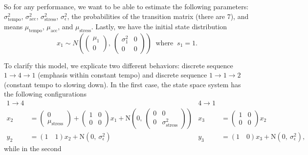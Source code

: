 \documentclass[12pt]{article}
\begin{document}
So for any performance, we want to be able to estimate
the following parameters: $\sigma_{\textrm{tempo}}^2$, $\sigma_{\textrm{acc}}^2$, $\sigma^2_{\textrm{stress}}$,
$\sigma_\epsilon^2$, the probabilities of the transition matrix (there
are 7), and means $\mu_{\textrm{tempo}}$, $\mu_{\textrm{acc}}$, and $\mu_{\textrm{stress}}$. Lastly, we have the initial state distribution
\[
x_1\sim N\left( \begin{pmatrix}\mu_1\\0\end{pmatrix}
  ,\ \begin{pmatrix} \sigma^2_1 & 0\\0 & 0
  \end{pmatrix}\right)\; \; \textrm{where} \; \; s_1=1.
\]

To clarify this model, we explicate two different behaviors: discrete
sequence $1\rightarrow 4\rightarrow 1$ (emphasis within constant tempo) and discrete sequence
$1\rightarrow 1\rightarrow 2$ (constant tempo to slowing down). In the
first case, the state space system has the following configurations
{\footnotesize
\begin{align*}
  1\rightarrow 4 && 4\rightarrow 1\\
  x_{2} &= \begin{pmatrix} 0\\ \mu_{\textrm{stress}} \end{pmatrix}
  + \begin{pmatrix}1&0\\0&0\end{pmatrix} x_{1} +
                           \mbox{N}\left(0,\ \begin{pmatrix}0&0\\0&\sigma_{\textrm{stress}}^2\end{pmatrix}\right)
        &   x_{3}
                    &= 
  \begin{pmatrix}1&0\\0&0\end{pmatrix} x_{2} \\
  y_2 &= (1\quad  1)  x_2 + \mbox{N}(0,\
                                 \sigma_\epsilon^2) &
y_3 &= (1\quad  0) x_3 + \mbox{N}(0,\
                                 \sigma_\epsilon^2),
\end{align*}
}%
while in the second
\end{document}
